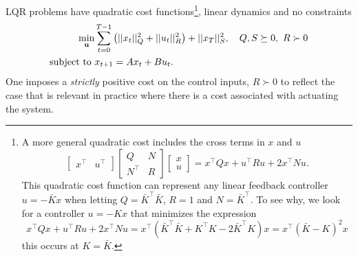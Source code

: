 LQR problems have quadratic cost functions\footnote{A more general quadratic cost includes the cross terms in $x$ and $u$
\begin{equation*}
  \begin{bmatrix}
    x^\top & u^\top
  \end{bmatrix}
  \begin{bmatrix}
    Q & N \\ N^\top & R
  \end{bmatrix}
  \begin{bmatrix}
    x \\ u
  \end{bmatrix} = x^\top Qx + u^\top Ru + 2x^\top N u.
\end{equation*}
This quadratic cost function can represent any linear feedback controller $u = -\bar{K}x$ when letting $Q = \bar{K}^\top \bar{K}$, $R = 1$ and $N = \bar{K}^\top$. To see why, we look for a controller $u=-Kx$ that minimizes the expression
\begin{equation*}
  x^\top Qx + u^\top Ru + 2x^\top N u = x^\top \left(\bar{K}^\top \bar{K} + K^\top K - 2 \bar{K}^\top K\right) x = x^\top \left(\bar{K}-K\right)^2x
\end{equation*}
this occurs at $K=\bar{K}$.}, linear dynamics and no constraints
\begin{equation}
  \label{eq:LQR-formulation}
  \begin{aligned}
    \min_{\boldsymbol{\mathrm{u}}} & \sum_{t=0}^{T-1} \left(||x_t||_Q^2 + ||u_t||_R^2\right) + ||x_T||_S^2,\quad Q,S \succeq 0,\ R \succ 0 \\
    \text{subject to } & x_{t+1} = Ax_t + Bu_t.
  \end{aligned}
\end{equation}
One imposes a \emph{strictly} positive cost on the control inputs, $R\succ 0$ to reflect the case that is relevant in practice where there is a cost associated with actuating the system.

